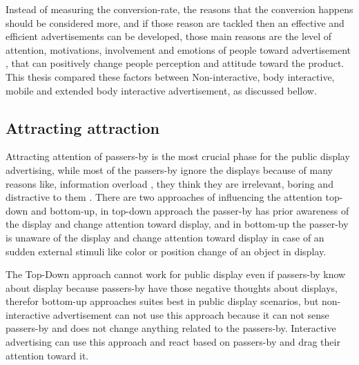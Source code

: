 Instead of measuring the conversion-rate, the reasons that the conversion happens should be considered more, and if those reason are tackled then an effective and efficient advertisements can be developed, those main reasons are the level of attention, motivations, involvement and emotions of people toward advertisement \cite{pervasiv_ad}, that can positively change people perception and attitude toward the product. This thesis compared these factors between Non-interactive, body interactive, mobile and extended body interactive advertisement, as discussed bellow.

\subsection{Attracting attraction}
Attracting attention of passers-by is the most crucial phase for the public display advertising, while most of the passers-by ignore the displays because of many reasons like, information overload \cite{Information_overload}, they think they are irrelevant, boring and distractive to them \cite{banner_blindness, display_blindness}. There are two approaches of influencing the attention top-down and bottom-up, in top-down approach the passer-by has prior awareness of the display and change attention toward display, and in bottom-up the passer-by is unaware of the display and change attention toward display in case of an sudden external stimuli like color \cite{Luminance} or position \cite{capturingattention} change of an object in display.  

The Top-Down approach cannot work for public display even if passers-by know about display because passers-by have those negative thoughts about displays, therefor bottom-up approaches suites best in public display scenarios, but non-interactive advertisement can not use this approach because it can not sense passers-by and does not change anything related to the passers-by. Interactive advertising can use this approach and react based on passers-by and drag their attention toward it.



